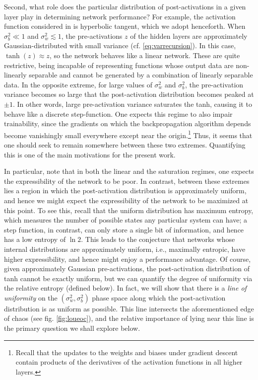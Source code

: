 Second, what role does the particular distribution of post-activations in a given layer play in determining network performance? For example, the activation function considered in \cite{2016arXiv161101232S} is hyperbolic tangent, which we adopt henceforth. When $\sigma_{b}^{2} \ll 1$ and $\sigma_{w}^{2} \lesssim 1$, the pre-activations $z$ of the hidden layers are approximately Gaussian-distributed with small variance (cf. \eqref{eq:varrecursion}). In this case, $\tanh(z)\approx z$, so the network behaves like a linear network. These are quite restrictive, being incapable of representing functions whose output data are non-linearly separable and cannot be generated by a combination of linearly separable data. In the opposite extreme, for large values of $\sigma_{w}^{2}$ and $\sigma_{b}^{2}$, the pre-activation variance becomes so large that the post-activation distribution becomes peaked at $\pm1$. In other words, large pre-activation variance saturates the tanh, causing it to behave like a discrete step-function. One expects this regime to also impair trainability, since the gradients on which the backpropagation algorithm depends become vanishingly small everywhere except near the origin.\footnote{Recall that the updates to the weights and biases under gradient descent contain products of the derivatives of the activation functions in all higher layers.} Thus, it seems that one should seek to remain somewhere between these two extremes. Quantifying this is one of the main motivations for the present work.

In particular, note that in both the linear and the saturation regimes, one expects the expressibility of the network to be poor. In contrast, between these extremes lies a region in which the post-activation distribution is approximately uniform, and hence we might expect the expressibility of the network to be maximized at this point. To see this, recall that the uniform distribution has maximum entropy, which measures the number of possible states any particular system can have; a step function, in contrast, can only store a single bit of information, and hence has a low entropy of $\ln2$. This leads to the conjecture that networks whose internal distributions are approximately uniform, i.e., maximally entropic, have higher expressibility, and hence might enjoy a performance advantage. Of course, given approximately Gaussian pre-activations, the post-activation distribution of tanh cannot be exactly uniform, but we can quantify the degree of uniformity via the relative entropy (defined below). In fact, we will show that there is a \emph{line of uniformity} on the $(\sigma_w^2, \sigma_b^2)$ phase space along which the post-activation distribution is as uniform as possible. This line intersects the aforementioned edge of chaos (see fig. \ref{fig:loueoc}), and the relative importance of lying near this line is the primary question we shall explore below. 

